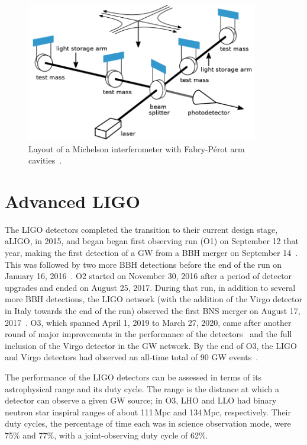 \begin{figure}[htb]
  \centering
  \includegraphics[width=0.9\textwidth]{figures/detectors/basic.png}
  \caption{Layout of a Michelson interferometer with Fabry-P\'erot arm cavities~\protect\citep{LIGO_layout_basic}.}
  \label{fig:detectors-basic}
\end{figure}


\section{Advanced LIGO}

The LIGO detectors completed the transition to their current design stage, \ac{aLIGO}, in 2015, and began began first observing run (\acs{O1}) on September 12 that year, making the first detection of a \ac{GW} from a \ac{BBH} merger on September 14~\citep{gw150914}.
This was followed by two more \ac{BBH} detections before the end of the run on January 16, 2016~\citep{gwtc1}.
\Ac{O2} started on November 30, 2016 after a period of detector upgrades and ended on August 25, 2017.
During that run, in addition to several more \ac{BBH} detections, the \ac{LIGO} network (with the addition of the Virgo detector in Italy towards the end of the run) observed the first \ac{BNS} merger on August 17, 2017~\citep{gw170817}.
\Ac{O3}, which spanned April 1, 2019 to March 27, 2020, came after another round of major improvements in the performance of the detectors~\citep{Buikema_2020} and the full inclusion of the Virgo detector in the \ac{GW} network.
By the end of O3, the LIGO and Virgo detectors had observed an all-time total of 90 GW events~\citep{gwtc2,gwtc3}.

The performance of the LIGO detectors can be assessed in terms of its astrophysical range and its duty cycle.
The range is the distance at which a detector can observe a given GW source; in O3, LHO and LLO had binary neutron star inspiral ranges of about 111\,Mpc and 134\,Mpc, respectively.
Their duty cycles, the percentage of time each was in science observation mode, were 75\% and 77\%, with a joint-observing duty cycle of 62\%.

